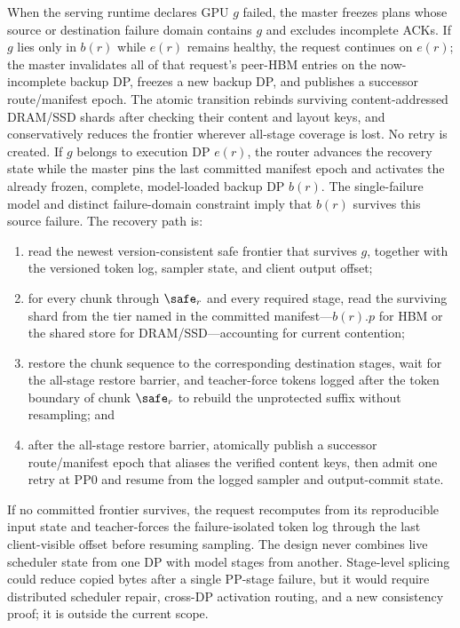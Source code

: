 When the serving runtime declares GPU $g$ failed, the master freezes plans
whose source or destination failure domain contains $g$ and excludes incomplete
ACKs.  If $g$ lies only in $b(r)$ while $e(r)$ remains healthy, the request
continues on $e(r)$; the master invalidates all of that request's peer-HBM
entries on the now-incomplete backup DP, freezes a new backup DP, and publishes
a successor route/manifest epoch.  The atomic transition rebinds surviving
content-addressed DRAM/SSD shards after checking their content and layout keys,
and conservatively reduces
the frontier wherever all-stage coverage is lost.  No retry is created.  If $g$ belongs to
execution DP $e(r)$, the router advances the
recovery state while the master pins the last committed manifest epoch and
activates the already frozen, complete, model-loaded backup DP $b(r)$.  The
single-failure model and distinct failure-domain constraint imply that $b(r)$
survives this source failure.  The recovery path is:
\begin{enumerate}
  \item read the newest version-consistent safe frontier that survives $g$,
  together with the versioned token log, sampler state, and client output
  offset;
  \item for every chunk through $\safe_r$ and every required stage, read the
  surviving shard from the tier named in the committed manifest---$b(r).p$ for
  HBM or the shared store for DRAM/SSD---accounting for current contention;
  \item restore the chunk sequence to the corresponding destination stages,
  wait for the all-stage restore barrier, and teacher-force tokens logged after
  the token boundary of chunk $\safe_r$ to rebuild the unprotected suffix
  without resampling; and
  \item after the all-stage restore barrier, atomically publish a successor
  route/manifest epoch that aliases the verified content keys, then admit one
  retry at PP0 and resume from the logged sampler and output-commit state.
\end{enumerate}
If no committed frontier survives, the request recomputes from its reproducible
input state and teacher-forces the failure-isolated token log through the last
client-visible offset before resuming sampling.  The design never combines live scheduler state from one DP with
model stages from another.  Stage-level splicing could reduce copied bytes
after a single PP-stage failure, but it would require distributed scheduler
repair, cross-DP activation routing, and a new consistency proof; it is outside
the current scope.

